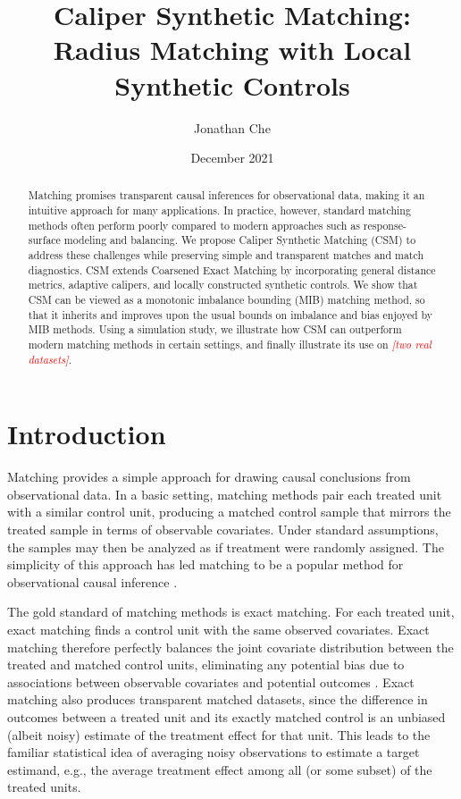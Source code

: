 \documentclass{article}
\title{Caliper Synthetic Matching: Radius Matching with Local Synthetic Controls}
\author{Jonathan Che}
\date{December 2021}
\newcommand{\note}[1]{\textcolor{red}{\textit{#1}}}
\begin{document}
\maketitle

\begin{abstract}
    Matching promises transparent causal inferences for observational data, making it an intuitive approach for many applications.
    In practice, however, standard matching methods often perform poorly compared to modern approaches such as response-surface modeling and balancing.
    We propose Caliper Synthetic Matching (CSM) to address these challenges while preserving simple and transparent matches and match diagnostics.
    CSM extends Coarsened Exact Matching \citep[CEM; ][]{iacus2012causal} by incorporating general distance metrics, adaptive calipers, and locally constructed synthetic controls.
    We show that CSM can be viewed as a monotonic imbalance bounding (MIB) matching method, so that it inherits and improves upon the usual bounds on imbalance and bias enjoyed by MIB methods.
    Using a simulation study, we illustrate how CSM can outperform modern matching methods in certain settings, and finally illustrate its use on \note{[two real datasets]}.
\end{abstract}

\section{Introduction}

Matching provides a simple approach for drawing causal conclusions from observational data.
In a basic setting, matching methods pair each treated unit with a similar control unit, producing a matched control sample that mirrors the treated sample in terms of observable covariates.
Under standard assumptions, the samples may then be analyzed as if treatment were randomly assigned.
The simplicity of this approach has led matching to be a popular method for observational causal inference \citep{imbens2004nonparametric}.

The gold standard of matching methods is exact matching.
For each treated unit, exact matching finds a control unit with the same observed covariates.
Exact matching therefore perfectly balances the joint covariate distribution between the treated and matched control units,
eliminating any potential bias due to associations between observable covariates and potential outcomes \citep{imai2008misunderstandings, rosenbaum1985bias}.
Exact matching also produces transparent matched datasets,
since the difference in outcomes between a treated unit and its exactly matched control is an unbiased (albeit noisy) estimate of the treatment effect for that unit.
This leads to the familiar statistical idea of averaging noisy observations to estimate a target estimand, e.g., the average treatment effect among all (or some subset) of the treated units.
\end{document}
